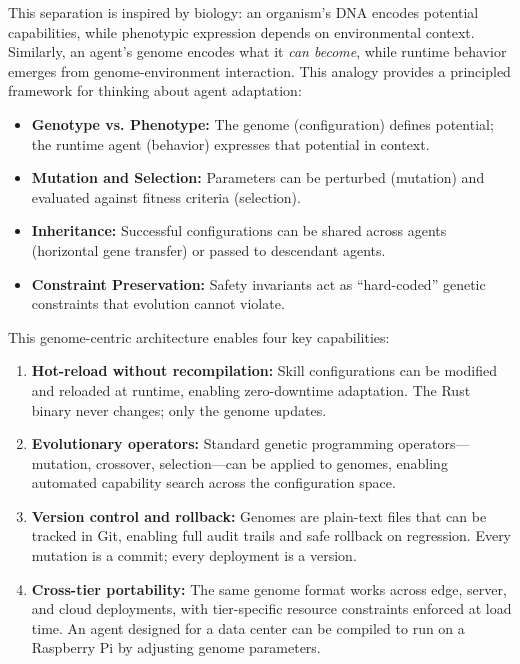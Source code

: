 \documentclass{article}
\begin{document}
This separation is inspired by biology: an organism's DNA encodes potential capabilities, while phenotypic expression depends on environmental context. Similarly, an agent's genome encodes what it \textit{can become}, while runtime behavior emerges from genome-environment interaction. This analogy provides a principled framework for thinking about agent adaptation:

\begin{itemize}[leftmargin=*]
    \item \textbf{Genotype vs. Phenotype:} The genome (configuration) defines potential; the runtime agent (behavior) expresses that potential in context.
    \item \textbf{Mutation and Selection:} Parameters can be perturbed (mutation) and evaluated against fitness criteria (selection).
    \item \textbf{Inheritance:} Successful configurations can be shared across agents (horizontal gene transfer) or passed to descendant agents.
    \item \textbf{Constraint Preservation:} Safety invariants act as ``hard-coded'' genetic constraints that evolution cannot violate.
\end{itemize}

This genome-centric architecture enables four key capabilities:

\begin{enumerate}[leftmargin=*]
    \item \textbf{Hot-reload without recompilation:} Skill configurations can be modified and reloaded at runtime, enabling zero-downtime adaptation. The Rust binary never changes; only the genome updates.
    
    \item \textbf{Evolutionary operators:} Standard genetic programming operators—mutation, crossover, selection—can be applied to genomes, enabling automated capability search across the configuration space.
    
    \item \textbf{Version control and rollback:} Genomes are plain-text files that can be tracked in Git, enabling full audit trails and safe rollback on regression. Every mutation is a commit; every deployment is a version.
    
    \item \textbf{Cross-tier portability:} The same genome format works across edge, server, and cloud deployments, with tier-specific resource constraints enforced at load time. An agent designed for a data center can be compiled to run on a Raspberry Pi by adjusting genome parameters.
\end{enumerate}
\end{document}
